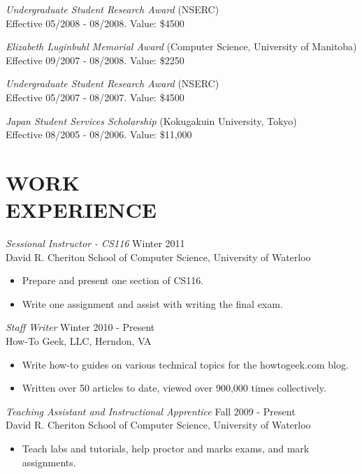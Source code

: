 \documentclass[line,margin]{res}
\begin{document}
\begin{resume}
  {\sl Undergraduate Student Research Award} (NSERC) \\
  \hspace*{1cm} Effective 05/2008 - 08/2008. Value: \$4500
  
  {\sl Elizabeth Luginbuhl Memorial Award} (Computer Science, University of Manitoba) \\
  \hspace*{1cm} Effective 09/2007 - 08/2008. Value: \$2250
  
  {\sl Undergraduate Student Research Award} (NSERC) \\
  \hspace*{1cm} Effective 05/2007 - 08/2007. Value: \$4500
  
  {\sl Japan Student Services Scholarship} (Kokugakuin University, Tokyo) \\
  \hspace*{1cm} Effective 08/2005 - 08/2006. Value: \$11,000

\section{WORK \\EXPERIENCE}
  {\sl Sessional Instructor - CS116} \hfill Winter 2011 \\
  David R. Cheriton School of Computer Science, University of Waterloo
  \begin{itemize}  \itemsep -2pt %
    \item Prepare and present one section of CS116.
    \item Write one assignment and assist with writing the final exam.
  \end{itemize}
  
  {\sl Staff Writer} \hfill Winter 2010 - Present \\
  How-To Geek, LLC, Herndon, VA
  \begin{itemize}  \itemsep -2pt %
    \item Write how-to guides on various technical topics for the howtogeek.com blog.
    \item Written over 50 articles to date, viewed over 900,000 times collectively.
  \end{itemize}

  {\sl Teaching Assistant and Instructional Apprentice} \hfill Fall 2009 - Present \\
  David R. Cheriton School of Computer Science, University of Waterloo
  \begin{itemize}  \itemsep -2pt %
    \item Teach labs and tutorials, help proctor and marks exams, and mark assignments. 
  \end{itemize}
  

\end{resume}
\end{document}
